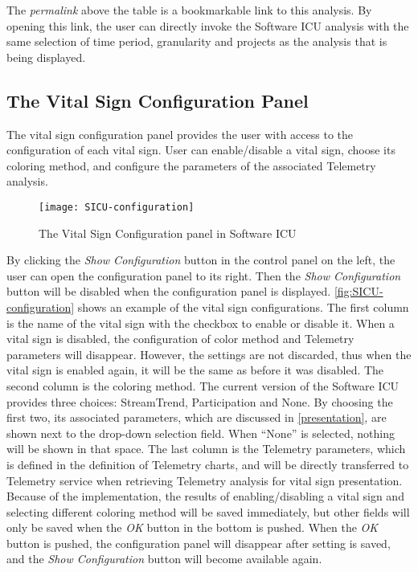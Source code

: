 The {\it permalink} above the table is a bookmarkable link to this analysis. By opening this link, the user can directly invoke the Software ICU analysis with the same selection of time period, granularity and projects as the analysis that is being displayed. 

\subsection{The Vital Sign Configuration Panel}
\label{SICUconfiguration}
The vital sign configuration panel provides the user with access to the configuration of each vital sign. User can enable/disable a vital sign, choose its coloring method, and configure the parameters of the associated Telemetry analysis. 

\begin{figure}[htbp]
   \centering
   \texttt{[image: SICU-configuration]} 
   \caption{The Vital Sign Configuration panel in Software ICU}
   \label{fig:SICU-configuration}
\end{figure}

By clicking the {\it Show Configuration} button in the control panel on the left, the user can open the configuration panel to its right. Then the {\it Show Configuration} button will be disabled when the configuration panel is displayed. \autoref{fig:SICU-configuration} shows an example of the vital sign configurations. The first column is the name of the vital sign with the checkbox to enable or disable it. When a vital sign is disabled, the configuration of color method and Telemetry parameters will disappear. However, the settings are not discarded, thus when the vital sign is enabled again, it will be the same as before it was disabled. The second column is the coloring method. The current version of the Software ICU provides three choices: StreamTrend, Participation and None. By choosing the first two, its associated parameters, which are discussed in \autoref{presentation}, are shown next to the drop-down selection field. When ``None'' is selected, nothing will be shown in that space. The last column is the Telemetry parameters, which is defined in the definition of Telemetry charts, and will be directly transferred to Telemetry service when retrieving Telemetry analysis for vital sign presentation. Because of the implementation, the results of enabling/disabling a vital sign and selecting different coloring method will be saved immediately, but other fields will only be saved when the {\it OK} button in the bottom is pushed. When the {\it OK} button is pushed, the configuration panel will disappear after setting is saved, and the {\it Show Configuration} button will become available again.


